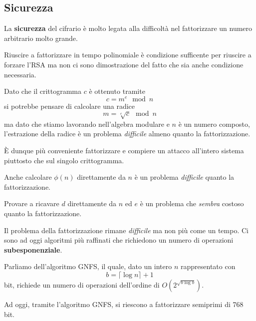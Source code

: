 \subsection{Sicurezza}
La \textbf{sicurezza} del cifrario \`e molto legata alla difficolt\`a nel fattorizzare un numero arbitrario molto
grande.

Riuscire a fattorizzare in tempo polinomiale \`e condizione sufficente per riuscire a forzare l'RSA ma non ci sono
dimostrazione del fatto che sia anche condizione necessaria.

Dato che il crittogramma $c$ \`e ottenuto tramite
\[ c = m^e \mod{n} \]
si potrebbe pensare di calcolare una radice
\[ m = \sqrt[e]{c} \mod{n} \]
ma dato che stiamo lavorando nell'algebra modulare e $n$ \`e un numero composto, l'estrazione della radice \`e un
problema \emph{difficile} almeno quanto la fattorizzazione.

\`E dunque pi\`u conveniente fattorizzare e compiere un attacco all'intero sistema piuttosto che sul singolo
crittogramma.

Anche calcolare $\phi(n)$ direttamente da $n$ \`e un problema \emph{difficile} quanto la fattorizzazione.

Provare a ricavare $d$ direttamente da $n$ ed $e$ \`e un problema che \emph{sembra} costoso quanto la
fattorizzazione.

Il problema della fattorizzazione rimane \emph{difficile} ma non pi\`u come un tempo. Ci sono ad oggi algoritmi
pi\`u raffinati che richiedono un numero di operazioni \textbf{subesponenziale}.

Parliamo dell'algoritmo GNFS, il quale, dato un intero $n$ rappresentato con
\[ b = \lceil \log n \rceil + 1 \]
bit, richiede un numero di operazioni dell'ordine di $O(2^{\sqrt{b \log b}})$.

Ad oggi, tramite l'algoritmo GNFS, si riescono a fattorizzare semiprimi di 768 bit.

